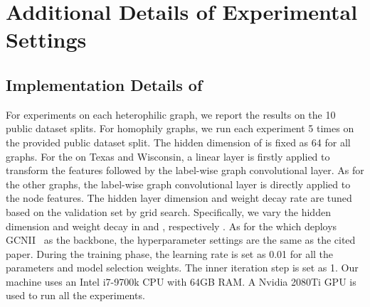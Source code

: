 \section{Additional Details of Experimental Settings}
\subsection{Implementation Details of {\method}}
\label{app:implement} 
For experiments on each heterophilic graph, we report the results on the 10 public dataset splits. For homophily graphs, we run each experiment 5 times on the provided public dataset split. 
The hidden dimension of  is fixed as 64 for all graphs. For the  on Texas and Wisconsin, a linear layer is firstly applied to transform the features followed by the label-wise graph convolutional layer. As for the other graphs, the label-wise graph convolutional layer is directly applied to the node features. The hidden layer dimension and weight decay rate are tuned based on the validation set by grid search. Specifically, we vary the hidden dimension and weight decay in  and , respectively .
As for the  which deploys GCNII~\cite{chen2020simple} as the backbone, the hyperparameter settings are the same as the cited paper. During the training phase, the learning rate is set as 0.01 for all the parameters and model selection weights. The inner iteration step  is set as 1. Our machine uses an Intel i7-9700k CPU with 64GB RAM. A Nvidia 2080Ti GPU is used to run all the experiments.


